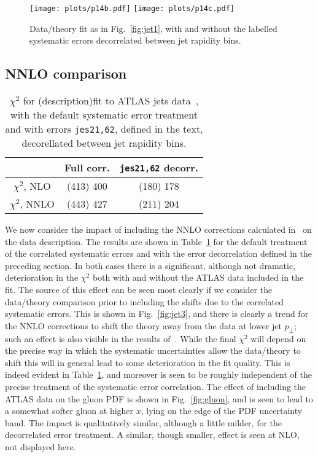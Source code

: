 \documentclass{appolb}
\begin{document}
\begin{figure}[htb]
\centerline{%
\texttt{[image: plots/p14b.pdf]}
\texttt{[image: plots/p14c.pdf]}}
\caption{Data/theory fit as in Fig.~\ref{fig:jet1}, with and without the labelled systematic errors decorrelated between jet rapidity bins.}
\label{fig:jet2}
\end{figure}

\subsection{NNLO comparison}

\begin{table}[h]
\begin{center}
\begin{tabular}{|c|c|c|}
\hline
&Full corr.&\texttt{jes21,62} decorr.\\
\hline
$\chi^2$, NLO&(413) 400& (180) 178\\
\hline
$\chi^2$, NNLO & (443) 427 & (211) 204\\
\hline
\end{tabular}
\caption{$\chi^2$  for (description)fit to ATLAS jets data~\cite{Aad:2014vwa}, with the default systematic error treatment and with errors \texttt{jes21,62}, defined in the text, decorellated between jet rapidity bins.}\label{tab:nnlo}
\end{center}
\end{table}


We now consider the impact of including the NNLO corrections calculated in~\cite{Currie:2016bfm} on the data description. The results are shown in Table~\ref{tab:nnlo} for the default treatment of the correlated systematic errors and with the error decorrelation defined in the preceding section. In both cases there is a significant, although not dramatic, deterioration in the $\chi^2$ both with and without the ATLAS data included in the fit.  The source of this effect can be seen most clearly if we consider the data/theory comparison prior to including the shifts due to the correlated systematic errors. This is shown in Fig.~\ref{fig:jet3}, and there is clearly a trend for the NNLO corrections to shift the theory away from the data at lower jet $p_\perp$; such an effect is also visible in the results of~\cite{Currie:2016bfm}. While the final $\chi^2$ will depend on the precise way in which the systematic uncertainties allow the data/theory to shift this will in general lead to some deterioration in the fit quality. This is indeed evident in Table~\ref{tab:nnlo}, and moreover is seen to be roughly independent of the precise treatment of the systematic error correlation. The effect of including the ATLAS data on the gluon PDF is shown in Fig.~\ref{fig:gluon}, and is seen to lead to a somewhat softer gluon at higher $x$, lying on the edge of the PDF uncertainty band. The impact is qualitatively similar, although a little milder, for the decorrelated error treatment. A similar, though smaller, effect is seen at NLO, not displayed here.
\end{document}
